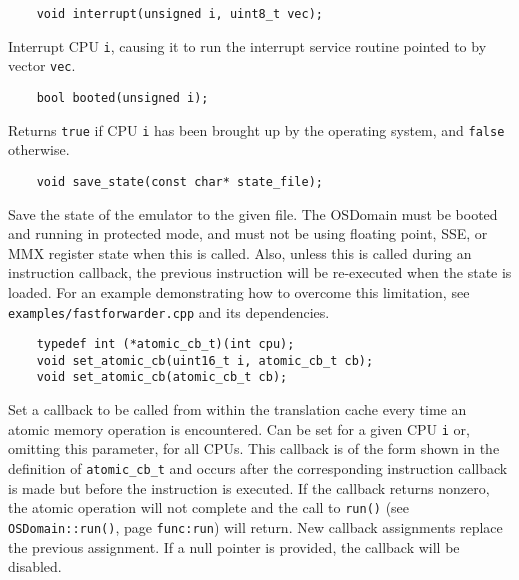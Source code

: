 \documentclass[letterpaper, 10pt]{book}
\begin{document}
\label{func:interrupt} \begin{verbatim}
    void interrupt(unsigned i, uint8_t vec);
\end{verbatim}
Interrupt CPU \texttt{i}, causing it to run the interrupt service routine
pointed to by vector \texttt{vec}.

\label{func:booted} \begin{verbatim}
    bool booted(unsigned i);
\end{verbatim}
Returns \texttt{true} if CPU \texttt{i} has been brought up by the operating
system, and \texttt{false} otherwise.

\label{func:save_state} \begin{verbatim}
    void save_state(const char* state_file);
\end{verbatim}
Save the state of the emulator to the given file. The OSDomain must be booted
and running in protected mode, and must not be using floating point, SSE, or MMX
register state when this is called. Also, unless this is called during an
instruction callback, the previous instruction will be re-executed when the state
is loaded. For an example demonstrating how to overcome this limitation, see
\texttt{examples/fastforwarder.cpp} and its dependencies.

\label{func:set_atomic_cb} \begin{verbatim}
    typedef int (*atomic_cb_t)(int cpu);
    void set_atomic_cb(uint16_t i, atomic_cb_t cb);
    void set_atomic_cb(atomic_cb_t cb);
\end{verbatim}
Set a callback to be called from within the translation cache every time an
atomic memory operation is encountered. Can be set for a given CPU \texttt{i}
or, omitting this parameter, for all CPUs. This callback is of the form shown
in the definition of \texttt{atomic\_cb\_t} and occurs after the corresponding
instruction callback is made but before the instruction is executed. If the
callback returns nonzero, the atomic operation will not complete and the
call to \texttt{run()} (see \texttt{OSDomain::run()}, page \texttt{func:run})
will return. New callback assignments replace the previous assignment. If a
null pointer is provided, the callback will be disabled.
\end{document}
